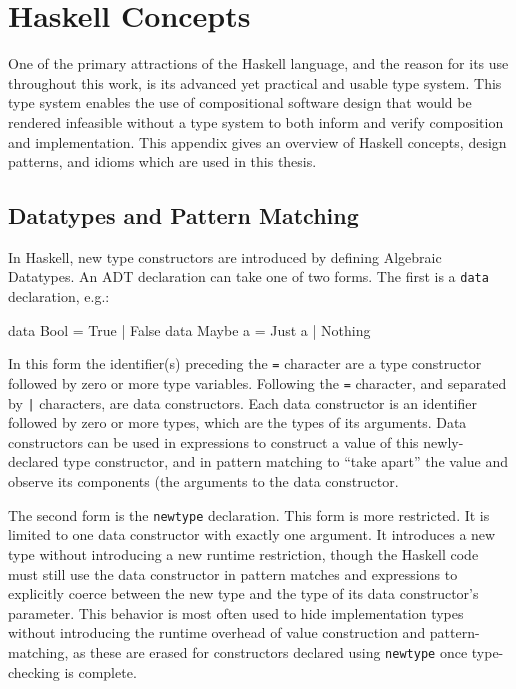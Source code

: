 \chapter{Haskell Concepts}
\label{chapter:Haskell_Concepts}

One of the primary attractions of the Haskell language, and the reason for its
use throughout this work, is its advanced yet practical and usable type system.
This type system enables the use of compositional software design that would
be rendered infeasible without a type system to both inform and verify
composition and implementation. This appendix gives an overview of Haskell
concepts, design patterns, and idioms which are used in this thesis.

\section{Datatypes and Pattern Matching}
\label{section:Haskell_Concepts-Datatypes_and_Pattern_Matching}

In Haskell, new type constructors are introduced by defining Algebraic Datatypes.
An ADT declaration can take one of two forms. The first is a {\tt data}
declaration, e.g.:

\begin{code}
data Bool = True | False
data Maybe a = Just a | Nothing
\end{code}

In this form the identifier(s) preceding the {\tt =} character are a type
constructor followed by zero or more type variables. Following the {\tt =} 
character, and separated by {\tt |} characters, are data constructors. Each data
constructor is an identifier followed by zero or more types, which are the types
of its arguments. Data constructors can be used in expressions to construct a
value of this newly-declared type constructor, and in pattern matching to
``take apart'' the value and observe its components (the arguments to the data
constructor.

The second form is the {\tt newtype} declaration. This form is more restricted.
It is limited to one data constructor with exactly one argument. It introduces
a new type without introducing a new runtime restriction, though the Haskell
code must still use the data constructor in pattern matches and expressions
to explicitly coerce between the new type and the type of its data constructor's
parameter. This behavior is most often used to hide implementation types without
introducing the runtime overhead of value construction and pattern-matching, as
these are erased for constructors declared using {\tt newtype} once type-checking
is complete.

